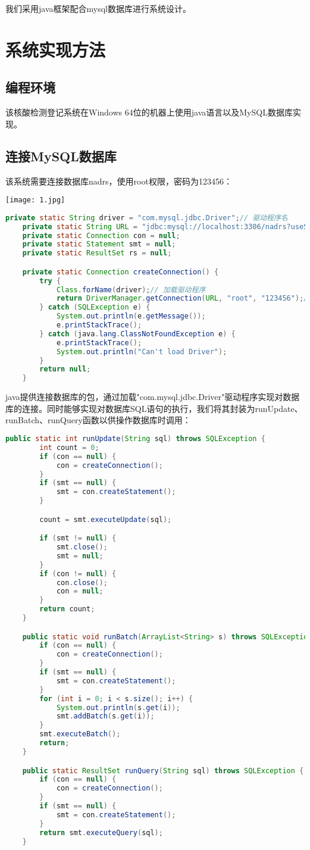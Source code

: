 \documentclass{article}
\begin{document}
我们采用java框架配合mysql数据库进行系统设计。
\section{系统实现方法}
\subsection{编程环境}
该核酸检测登记系统在Windows 64位的机器上使用java语言以及MySQL数据库实现。
\subsection{连接MySQL数据库}
该系统需要连接数据库nadrs，使用root权限，密码为123456：
\begin{center}
   \texttt{[image: 1.jpg]}
\end{center}
\begin{lstlisting}[language = java]
   private static String driver = "com.mysql.jdbc.Driver";// 驱动程序名
	private static String URL = "jdbc:mysql://localhost:3306/nadrs?useSSL=false&allowPublicKeyRetrieval=true";// URL指向访问的数据库
	private static Connection con = null;
	private static Statement smt = null;
	private static ResultSet rs = null;

	private static Connection createConnection() {
		try {
			Class.forName(driver);// 加载驱动程序
			return DriverManager.getConnection(URL, "root", "123456");// 以root权限连接数据库
		} catch (SQLException e) {
			System.out.println(e.getMessage());
			e.printStackTrace();
		} catch (java.lang.ClassNotFoundException e) {
			e.printStackTrace();
			System.out.println("Can't load Driver");
		}
		return null;
	}
\end{lstlisting}

java提供连接数据库的包，通过加载"com.mysql.jdbc.Driver"驱动程序实现对数据库的连接。同时能够实现对数据库SQL语句的执行，我们将其封装为runUpdate、runBatch、runQuery函数以供操作数据库时调用：
\begin{lstlisting}[language = java]
   public static int runUpdate(String sql) throws SQLException {
		int count = 0;
		if (con == null) {
			con = createConnection();
		}
		if (smt == null) {
			smt = con.createStatement();
		}

		count = smt.executeUpdate(sql);

		if (smt != null) {
			smt.close();
			smt = null;
		}
		if (con != null) {
			con.close();
			con = null;
		}
		return count;
	}

	public static void runBatch(ArrayList<String> s) throws SQLException {
		if (con == null) {
			con = createConnection();
		}
		if (smt == null) {
			smt = con.createStatement();
		}
		for (int i = 0; i < s.size(); i++) {
			System.out.println(s.get(i));
			smt.addBatch(s.get(i));
		}
		smt.executeBatch();
		return;
	}

	public static ResultSet runQuery(String sql) throws SQLException {
		if (con == null) {
			con = createConnection();
		}
		if (smt == null) {
			smt = con.createStatement();
		}
		return smt.executeQuery(sql);
	}
\end{lstlisting}
\end{document}
